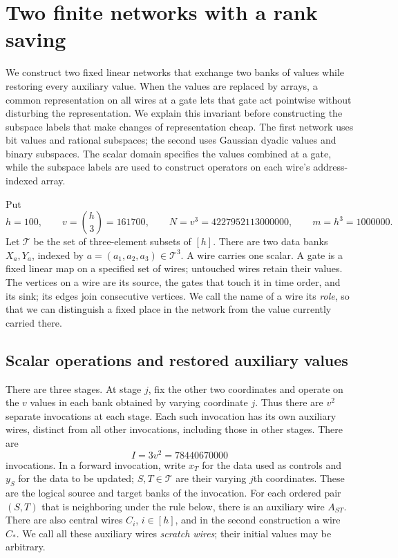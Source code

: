 \section{Two finite networks with a rank saving}
\label{sec:finite-networks}

We construct two fixed linear networks that exchange two banks of values
while restoring every auxiliary value.  When the values are replaced by
arrays, a common representation on all wires at a gate lets that gate act
pointwise without disturbing the representation.  We explain this invariant
before constructing the subspace labels that make changes of representation
cheap.  The first network uses bit values and rational subspaces; the second
uses Gaussian dyadic values and binary subspaces.  The scalar domain specifies
the values combined at a gate, while the subspace labels are used to construct operators
on each wire's address-indexed array.

Put
\[
 h=100,\qquad v=\binom h3=161700,\qquad
 N=v^3=4227952113000000,\qquad m=h^3=1000000.
\]
Let $\mathcal T$ be the set of three-element subsets of $[h]$.
There are two data banks $X_a,Y_a$, indexed by
$a=(a_1,a_2,a_3)\in\mathcal T^3$.
A wire carries one scalar.  A gate is a fixed linear map on a specified
set of wires; untouched wires retain their values.  The vertices on a
wire are its source, the gates that touch it in time order, and its sink;
its edges join consecutive vertices.  We call the name of a wire its
\emph{role}, so that we can distinguish a fixed place in the network
from the value currently carried there.

\subsection{Scalar operations and restored auxiliary values}

There are three stages.  At stage $j$, fix the other two coordinates and
operate on the $v$ values in each bank obtained by varying coordinate $j$.  Thus
there are $v^2$ separate invocations at each stage.
Each such invocation has its own auxiliary wires, distinct from all
other invocations, including those in other stages.  There are
\[
 I=3v^2=78440670000
\]
invocations.  In a forward invocation, write $x_T$ for the data used as
controls and $y_S$ for the data to be updated; $S,T\in\mathcal T$ are
their varying $j$th coordinates.  These are the logical source and
target banks of the invocation.  For each ordered pair $(S,T)$ that is
neighboring under the rule below, there is an auxiliary wire $A_{ST}$.
There are also central wires $C_i$, $i\in[h]$, and in the second
construction a wire $C_\ast$.  We call all these auxiliary wires
\emph{scratch wires}; their initial values may be arbitrary.

